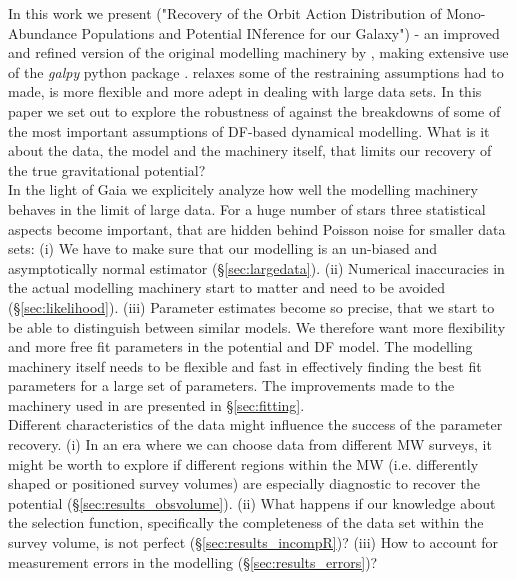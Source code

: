 In this work we present \RM ("\textsc{R}ecovery of the \textsc{O}rbit \textsc{A}ction \textsc{D}istribution of \textsc{M}ono-\textsc{A}bundance \textsc{P}opulations and \textsc{P}otential \textsc{IN}ference for our \textsc{G}alaxy") - an improved and refined version of the original modelling machinery by \citet{bov13}, making extensive use of the \emph{galpy} python package \citep{bov15}. \RM relaxes some of the restraining assumptions \citet{bov13} had to made, is more flexible and more adept in dealing with large data sets. In this paper we set out to explore the robustness of \RM against the breakdowns of some of the most important assumptions of DF-based dynamical modelling. What is it about the data, the model and the machinery itself, that limits our recovery of the true gravitational potential? \\

In the light of Gaia we explicitely analyze how well the modelling machinery behaves in the limit of large data. For a huge number of stars three statistical aspects become important, that are  hidden behind Poisson noise for smaller data sets: (i) We have to make sure that our modelling is an un-biased and asymptotically normal estimator (\S\ref{sec:largedata}). (ii) Numerical inaccuracies in the actual modelling machinery start to matter and need to be avoided (\S\ref{sec:likelihood}). (iii) Parameter estimates become so precise, that we start to be able to distinguish between similar models. We therefore want more flexibility and more free fit parameters in the potential and DF model. The modelling machinery itself needs to be flexible and fast in effectively finding the best fit parameters for a large set of parameters. The improvements made to the machinery used in \citet{bov13} are presented in \S\ref{sec:fitting}. \\

Different characteristics of the data might influence the success of the parameter recovery. (i) In an era where we can choose data from different MW surveys, it might be worth to explore if different regions within the MW (i.e. differently shaped or positioned survey volumes) are especially diagnostic to recover the potential (\S\ref{sec:results_obsvolume}). (ii) What happens if our knowledge about the selection function, specifically the completeness of the data set within the survey volume, is not perfect (\S\ref{sec:results_incompR})? (iii) How to account for measurement errors in the modelling (\S\ref{sec:results_errors})? \\

